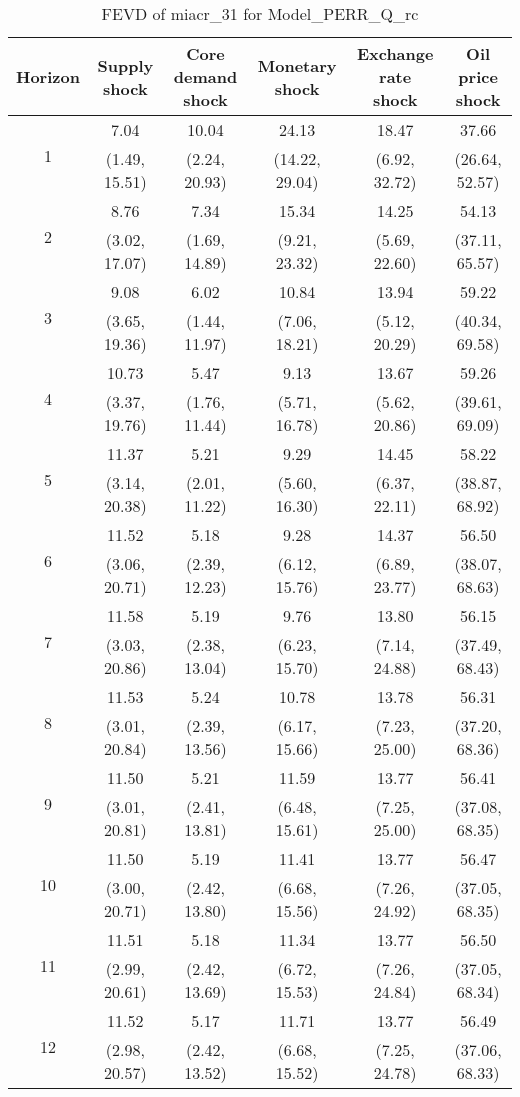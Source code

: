 \documentclass{article}
\begin{document}
\begin{table}
	\footnotesize
	\caption{FEVD of miacr_31 for Model_PERR_Q_rc}
	\begin{tabular}{cccccc}
		Horizon & Supply shock & Core demand shock & Monetary shock & Exchange rate shock & Oil price shock\\ \hline
		\multirow{2}{*}{1} & 7.04 & 10.04 & 24.13 & 18.47 & 37.66\\
		 & (1.49, 15.51) & (2.24, 20.93) & (14.22, 29.04) & (6.92, 32.72) & (26.64, 52.57)\\
		\multirow{2}{*}{2} & 8.76 & 7.34 & 15.34 & 14.25 & 54.13\\
		 & (3.02, 17.07) & (1.69, 14.89) & (9.21, 23.32) & (5.69, 22.60) & (37.11, 65.57)\\
		\multirow{2}{*}{3} & 9.08 & 6.02 & 10.84 & 13.94 & 59.22\\
		 & (3.65, 19.36) & (1.44, 11.97) & (7.06, 18.21) & (5.12, 20.29) & (40.34, 69.58)\\
		\multirow{2}{*}{4} & 10.73 & 5.47 & 9.13 & 13.67 & 59.26\\
		 & (3.37, 19.76) & (1.76, 11.44) & (5.71, 16.78) & (5.62, 20.86) & (39.61, 69.09)\\
		\multirow{2}{*}{5} & 11.37 & 5.21 & 9.29 & 14.45 & 58.22\\
		 & (3.14, 20.38) & (2.01, 11.22) & (5.60, 16.30) & (6.37, 22.11) & (38.87, 68.92)\\
		\multirow{2}{*}{6} & 11.52 & 5.18 & 9.28 & 14.37 & 56.50\\
		 & (3.06, 20.71) & (2.39, 12.23) & (6.12, 15.76) & (6.89, 23.77) & (38.07, 68.63)\\
		\multirow{2}{*}{7} & 11.58 & 5.19 & 9.76 & 13.80 & 56.15\\
		 & (3.03, 20.86) & (2.38, 13.04) & (6.23, 15.70) & (7.14, 24.88) & (37.49, 68.43)\\
		\multirow{2}{*}{8} & 11.53 & 5.24 & 10.78 & 13.78 & 56.31\\
		 & (3.01, 20.84) & (2.39, 13.56) & (6.17, 15.66) & (7.23, 25.00) & (37.20, 68.36)\\
		\multirow{2}{*}{9} & 11.50 & 5.21 & 11.59 & 13.77 & 56.41\\
		 & (3.01, 20.81) & (2.41, 13.81) & (6.48, 15.61) & (7.25, 25.00) & (37.08, 68.35)\\
		\multirow{2}{*}{10} & 11.50 & 5.19 & 11.41 & 13.77 & 56.47\\
		 & (3.00, 20.71) & (2.42, 13.80) & (6.68, 15.56) & (7.26, 24.92) & (37.05, 68.35)\\
		\multirow{2}{*}{11} & 11.51 & 5.18 & 11.34 & 13.77 & 56.50\\
		 & (2.99, 20.61) & (2.42, 13.69) & (6.72, 15.53) & (7.26, 24.84) & (37.05, 68.34)\\
		\multirow{2}{*}{12} & 11.52 & 5.17 & 11.71 & 13.77 & 56.49\\
		 & (2.98, 20.57) & (2.42, 13.52) & (6.68, 15.52) & (7.25, 24.78) & (37.06, 68.33)\\
	\end{tabular}
\label{tab:fevd-Model_PERR_Q_rc-miacr_31}
\end{table}
\end{document}
